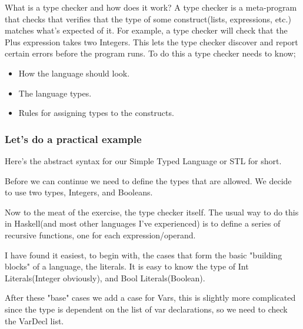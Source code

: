         What is a type checker and how does it work? 
        A type checker is a meta-program that checks that verifies that the type of some construct(lists, expressions, etc.) matches what's expected of it.
        For example, a type checker will check that the Plus \gls{expression} takes two Integers. This lets the type checker discover and report certain errors before the program runs. 
        To do this a type checker needs to know;
        \begin{itemize}
            \item How the language should look.
            \item The language types.
            \item Rules for assigning types to the constructs.
        \end{itemize}
        \subsubsection*{Let's do a practical example}
        Here's the abstract syntax for our Simple Typed Language or STL for short.
        
        Before we can continue we need to define the types that are allowed. We decide to use two types, Integers, and Booleans.
        
        
        Now to the meat of the exercise, the type checker itself.
        The usual way to do this in Haskell(and most other languages I've experienced) is to define a series of recursive functions, one for each
        expression/operand.
        
        
        I have found it easiest, to begin with, the cases that form the basic "building blocks" of a language, the literals. It is easy to know the type of Int Literals(Integer obviously), and Bool Literals(Boolean).
        
        
        After these "base" cases we add a case for Vars, this is slightly more complicated since the type is dependent on the list of var declarations, 
        so we need to check the VarDecl list.
        
        
